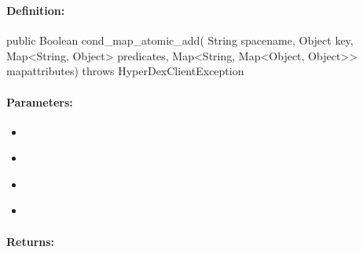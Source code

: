 \pagebreak
\subsubsection{}
\label{api:java:cond_map_atomic_add}


\paragraph{Definition:}
\begin{javacode}
public Boolean cond_map_atomic_add(
        String spacename,
        Object key,
        Map<String, Object> predicates,
        Map<String, Map<Object, Object>> mapattributes) throws HyperDexClientException
\end{javacode}

\paragraph{Parameters:}
\begin{itemize}[noitemsep]
\item {}\\

\item {}\\

\item {}\\

\item {}\\

\end{itemize}

\paragraph{Returns:}


\pagebreak
\subsubsection{}
\label{api:java:async_cond_map_atomic_add}


